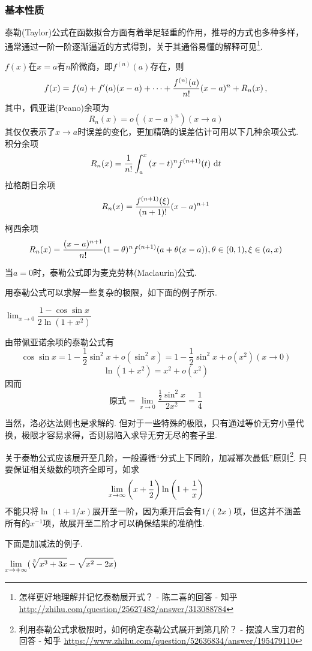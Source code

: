 \subsubsection{基本性质}
泰勒(Taylor)公式在函数拟合方面有着举足轻重的作用，推导的方式也多种多样，通常通过一阶一阶逐渐逼近的方式得到，关于其通俗易懂的解释可见\footnote{怎样更好地理解并记忆泰勒展开式？ - 陈二喜的回答 - 知乎 \url{http://zhihu.com/question/25627482/answer/313088784}}.
\begin{theorem}[带余项的泰勒公式]
$f(x)$在$x=a$有$n$阶微商，即$f^{(n)}(a)$存在，则
\[f(x)=f(a)+f'(a)(x-a)+\cdots+\dfrac{f^{(n)}(a)}{n!}(x-a)^n+R_n(x)\,,\]
其中，佩亚诺(Peano)余项为
\[R_n(x)=o((x-a)^n)(x\to a)\]
其仅仅表示了$x\to a$时误差的变化，更加精确的误差估计可用以下几种余项公式. 积分余项
\[R_n(x)=\dfrac{1}{n!}\displaystyle\int_{a}^{x}{(x-t)^nf^{(n+1)}(t)}\,\,\mathrm{d} t\]
拉格朗日余项%
\[R_n(x)=\dfrac{f^{(n+1)}(\xi)}{(n+1)!}(x-a)^{n+1}\]
柯西余项%
\[R_n(x)=\dfrac{(x-a)^{n+1}}{n!}(1-\theta)^nf^{(n+1)}(a+\theta(x-a)),\theta\in(0,1),\xi\in(a,x)\]
\end{theorem}
当$a=0$时，泰勒公式即为麦克劳林(Maclaurin)公式.
\par 用泰勒公式可以求解一些复杂的极限，如下面的例子所示.
\begin{example}
$\displaystyle\lim_{x\to 0}\dfrac{1-\cos\sin x}{2\ln(1+x^2)}$
\end{example}
\begin{analysis}
由带佩亚诺余项的泰勒公式有
\[\cos\sin x=1-\dfrac{1}{2}\sin^2 x+o(\sin^2 x)=1-\dfrac{1}{2}\sin^2x+o(x^2)(x\to 0)\]
\[\ln(1+x^2)=x^2+o(x^2)\]
因而
\[\text{原式}=\lim_{x\to 0}\dfrac{\frac{1}{2}\sin^2x}{2x^2}=\dfrac{1}{4}\]
\end{analysis}
\par 当然，洛必达法则也是求解的. 但对于一些特殊的极限，只有通过等价无穷小量代换，极限才容易求得，否则易陷入求导无穷无尽的套子里.
\par 关于泰勒公式应该展开至几阶，一般遵循“分式上下同阶，加减幂次最低”原则\footnote{利用泰勒公式求极限时，如何确定泰勒公式展开到第几阶？ - 摆渡人宝刀君的回答 - 知乎 \url{https://www.zhihu.com/question/52636834/answer/195479110}}.
只要保证相关级数的项齐全即可，如求
\[\lim_{x\to \infty}\left(x+\dfrac{1}{2}\right)\ln\left(1+\dfrac{1}{x}\right)\]
不能只将$\ln(1+1/x)$展开至一阶，因为乘开后会有$1/(2x)$项，但这并不涵盖所有的$x^{-1}$项，故展开至二阶才可以确保结果的准确性.
\par 下面是加减法的例子.
\begin{example}
$\displaystyle\lim_{x\to+\infty}(\sqrt[3]{x^3+3x}-\sqrt{x^2-2x})$
\end{example}
